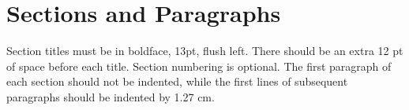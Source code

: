 \section{Sections and Paragraphs}

Section titles must be in boldface, 13pt, flush left. There should be an extra
12 pt of space before each title. Section numbering is optional. The first
paragraph of each section should not be indented, while the first lines of
subsequent paragraphs should be indented by 1.27 cm.

